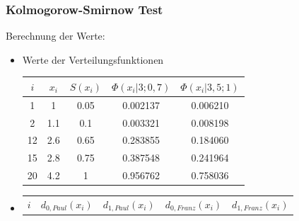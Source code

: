 \documentclass{beamer}
\begin{document}
\begin{frame}
\frametitle{Kolmogorow-Smirnow Test}
Berechnung der Werte:\\
	\begin{itemize}
		\item Werte der Verteilungsfunktionen
			\begin{table}[ht]
			\center
			\begin{tabular}{c|c|c|c|c}
			$i$ 	& $x_i$ 	& $S(x_i)$ 	& $\Phi (x_i|3;0,7)$ 	& $\Phi (x_i|3,5;1)$ 	\\
			\hline
			1	&	1	&	0.05	&	0.002137	&	0.006210	\\
			2	&	1.1	&	0.1	&	0.003321	&	0.008198	\\
			12	&	2.6	&	0.65	&	0.283855	&	0.184060	\\
			15	&	2.8	&	0.75	&	0.387548	&	0.241964	\\
			20	&	4.2	&	1	&	0.956762	&	0.758036	\\
			\end{tabular}
			\end{table}
		\item
\begin{table}[ht]
\center
\begin{tabular}{c|c|c|c|c}
$i$ 	& $d_{0,Paul}(x_i)$ 	& $d_{1,Paul}(x_i)$ 	& $d_{0,Franz}(x_i)$ 	& $d_{1,Franz}(x_i)$ 	\\

\end{tabular}
\end{table}
\end{itemize}
\end{frame}
\end{document}

